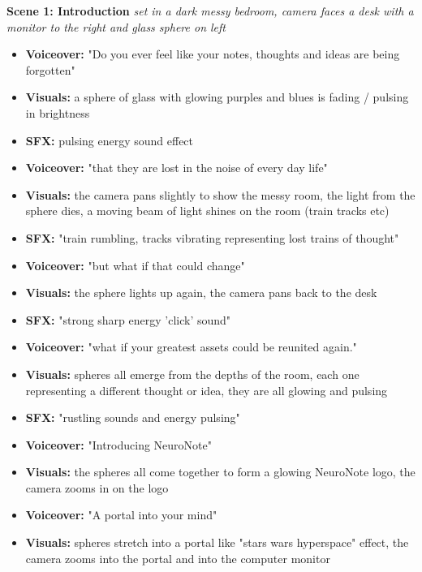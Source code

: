 \textbf{Scene 1: Introduction}
\textit{set in a dark messy bedroom, camera faces a desk with a monitor to the right and glass sphere on left}
\begin{itemize}
    \item [0:00] \textbf{Voiceover:} "Do you ever feel like your notes, thoughts and ideas are being forgotten"
    \item \textbf{Visuals:} a sphere of glass with glowing purples and blues is fading / pulsing in brightness
    \item [0:00] \textbf{SFX:} pulsing energy sound effect
    \item [0:05] \textbf{Voiceover:} "that they are lost in the noise of every day life"
    \item \textbf{Visuals:} the camera pans slightly to show the messy room, the light from the sphere dies, a moving beam of light shines on the room (train tracks etc)
    \item [0:10] \textbf{SFX:} "train rumbling, tracks vibrating representing lost trains of thought"
    \item [0:10] \textbf{Voiceover:} "but what if that could change"
    \item \textbf{Visuals:} the sphere lights up again, the camera pans back to the desk
    \item [0:15] \textbf{SFX:} "strong sharp energy 'click' sound"
    \item [0:15] \textbf{Voiceover:} "what if your greatest assets could be reunited again."
    \item \textbf{Visuals:} spheres all emerge from the depths of the room, each one representing a different thought or idea, they are all glowing and pulsing
    \item [0:20] \textbf{SFX:} "rustling sounds and energy pulsing"
    \item [0:20] \textbf{Voiceover:} "Introducing NeuroNote"
    \item \textbf{Visuals:} the spheres all come together to form a glowing NeuroNote logo, the camera zooms in on the logo
    \item [0:20] \textbf{Voiceover:} "A portal into your mind"
    \item \textbf{Visuals:} spheres stretch into a portal like "stars wars hyperspace" effect, the camera zooms into the portal and into the computer monitor
\end{itemize}

